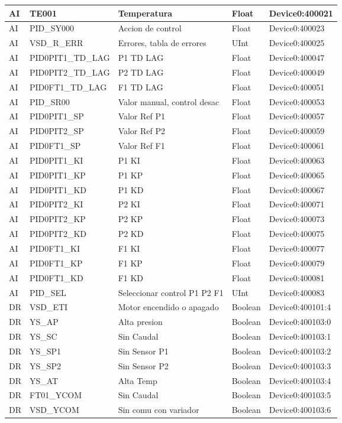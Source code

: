\begin{longtable}{|p{1.2cm} |p{4cm} |p{4cm} |p{1.5cm} |p{3.2cm} |}
	AI & TE001 & Temperatura & Float & Device0:400021 \\ \hline
	AI & PID\_SY000 & Accion de control & Float & Device0:400023 \\ \hline
	AI & VSD\_R\_ERR & Errores, tabla de errores & UInt & Device0:400025 \\ \hline
	AI & PID0PIT1\_TD\_LAG & P1 TD LAG & Float & Device0:400047 \\ \hline
	AI & PID0PIT2\_TD\_LAG & P2 TD LAG & Float & Device0:400049 \\ \hline
	AI & PID0FT1\_TD\_LAG & F1 TD LAG & Float & Device0:400051 \\ \hline
	AI & PID\_SR00 & Valor manual, control desac & Float & Device0:400053 \\ \hline
	AI & PID0PIT1\_SP & Valor Ref P1 & Float & Device0:400057 \\ \hline
	AI & PID0PIT2\_SP & Valor Ref P2 & Float & Device0:400059 \\ \hline
	AI & PID0FT1\_SP & Valor Ref F1 & Float & Device0:400061 \\ \hline
	AI & PID0PIT1\_KI & P1 KI & Float & Device0:400063 \\ \hline
	AI & PID0PIT1\_KP & P1 KP & Float & Device0:400065 \\ \hline
	AI & PID0PIT1\_KD & P1 KD & Float & Device0:400067 \\ \hline
	AI & PID0PIT2\_KI & P2 KI & Float & Device0:400071 \\ \hline
	AI & PID0PIT2\_KP & P2 KP & Float & Device0:400073 \\ \hline
	AI & PID0PIT2\_KD & P2 KD & Float & Device0:400075 \\ \hline
	AI & PID0FT1\_KI & F1 KI & Float & Device0:400077 \\ \hline
	AI & PID0FT1\_KP & F1 KP & Float & Device0:400079 \\ \hline
	AI & PID0FT1\_KD & F1 KD & Float & Device0:400081 \\ \hline
	AI & PID\_SEL & Seleccionar control P1 P2 F1 & UInt & Device0:400083 \\ \hline
	DR & VSD\_ETI & Motor encendido o apagado & Boolean & Device0:400101:4 \\ \hline
	DR & YS\_AP & Alta presion & Boolean & Device0:400103:0 \\ \hline
	DR & YS\_SC & Sin Caudal & Boolean & Device0:400103:1 \\ \hline
	DR & YS\_SP1 & Sin Sensor P1 & Boolean & Device0:400103:2 \\ \hline
	DR & YS\_SP2 & Sin Sensor P2 & Boolean & Device0:400103:3 \\ \hline
	DR & YS\_AT & Alta Temp & Boolean & Device0:400103:4 \\ \hline
	DR & FT01\_YCOM & Sin Caudal & Boolean & Device0:400103:5 \\ \hline
	DR & VSD\_YCOM & Sin comu con variador & Boolean & Device0:400103:6 \\ \hline
	
	
\end{longtable}

